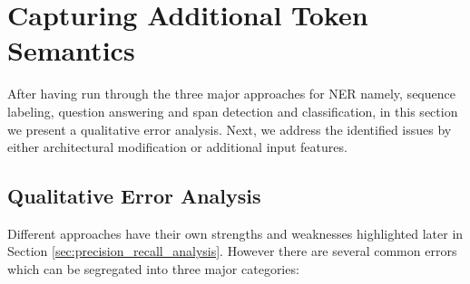 \section{Capturing Additional Token Semantics}
\label{sec:additional_token_semantics}
After having run through the three major approaches for NER namely, sequence labeling, question answering and span detection and classification, in this section we present a qualitative error analysis. Next, we address the identified issues by either architectural modification or additional input features.

\subsection{Qualitative Error Analysis}
\label{subsec:qualitative_analysis}

Different approaches have their own strengths and weaknesses highlighted later in Section \ref{sec:precision_recall_analysis}. However there are several common errors which can be segregated into three major categories:

